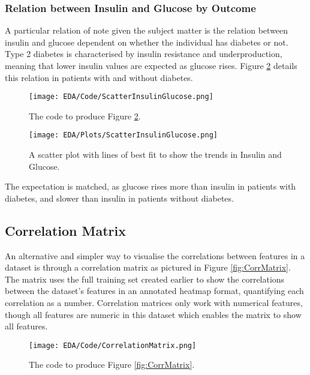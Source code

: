 \subsubsection{Relation between Insulin and Glucose by Outcome}
A particular relation of note given the subject matter is the relation between insulin and glucose dependent on whether the 
individual has diabetes or not. Type 2 diabetes is characterised by insulin resistance and underproduction, meaning that lower insulin values are 
expected as glucose rises. Figure \ref{fig:ScatterInsulinGlucose} details this relation in patients with and without diabetes.

\begin{figure}[H]
    \centering
    \texttt{[image: EDA/Code/ScatterInsulinGlucose.png]}
    \caption{The code to produce Figure \ref{fig:ScatterInsulinGlucose}.}
    \label{fig:ScatterInsulinGlucoseCode}
\end{figure}

\begin{figure}[H]
    \centering
    \texttt{[image: EDA/Plots/ScatterInsulinGlucose.png]}
    \caption{A scatter plot with lines of best fit to show the trends in Insulin and Glucose.}
    \label{fig:ScatterInsulinGlucose}
\end{figure}

\para The expectation is matched, as glucose rises more than insulin in patients with diabetes, and slower 
than insulin in patients without diabetes.



\subsection{Correlation Matrix}
An alternative and simpler way to visualise the correlations between features in a dataset is through a correlation matrix as 
pictured in Figure \ref{fig:CorrMatrix}. The matrix uses the full training set created earlier to show the correlations between 
the dataset's features in an annotated heatmap format, quantifying each correlation as a number. Correlation matrices only work with numerical features, 
though all features are numeric in this dataset which enables the matrix to show all features. 

\begin{figure}[H]
    \centering
    \texttt{[image: EDA/Code/CorrelationMatrix.png]}
    \caption{The code to produce Figure \ref{fig:CorrMatrix}.}
    \label{fig:CorrMatrixCode}
\end{figure}

